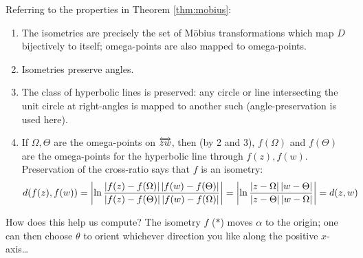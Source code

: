 Referring to the properties in Theorem \ref{thm:mobius}:
\begin{enumerate}\itemsep0pt
  \item The isometries are precisely the set of Möbius transformations which map $D$ bijectively to itself; omega-points are also mapped to omega-points.
  \item Isometries preserve angles.
  \item The class of hyperbolic lines is preserved: any circle or line intersecting the unit circle at right-angles is mapped to another such (angle-preservation is used here). 
  \item If $\Omega,\Theta$ are the omega-points on $\overleftrightarrow{zw}$, then (by 2 and 3), $f(\Omega)$ and $f(\Theta)$ are the omega-points for the hyperbolic line through $f(z),f(w)$. Preservation of the cross-ratio says that $f$ is an isometry:
  \[d(f(z),f(w))=\left| \ln\frac{\left| f(z)-f(\Omega)\right|\left| f(w)-f(\Theta)\right|}{\left| f(z)-f(\Theta)\right|\left| f(w)-f(\Omega)\right|}\right|= \left| \ln\frac{\left| z-\Omega\right|\left| w-\Theta\right|}{\left| z-\Theta\right|\left| w-\Omega\right|}\right|=d(z,w)\]
\end{enumerate}

How does this help us compute? The isometry $f$ ($\ast$) moves $\alpha$ to the origin; one can then choose $\theta$ to orient whichever direction you like along the positive $x$-axis\ldots



% 
% 


